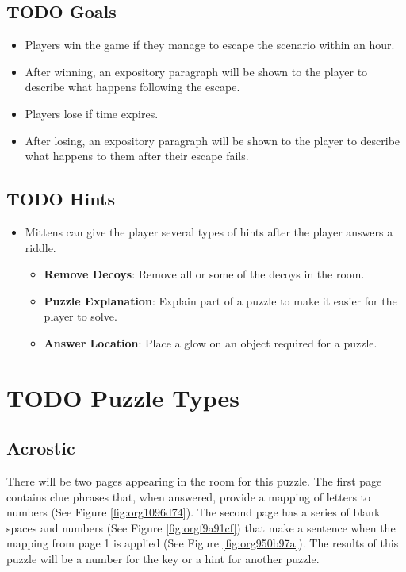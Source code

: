\documentclass[11pt]{article}
\begin{document}
\subsection{{\bfseries\sffamily TODO} Goals}
\label{sec:orgcfdaecd}
\begin{itemize}
\item Players win the game if they manage to escape the scenario within an hour.
\item After winning, an expository paragraph will be shown to the player to describe what happens following the escape.
\item Players lose if time expires.
\item After losing, an expository paragraph will be shown to the player to describe what happens to them after their escape fails.
\end{itemize}

\subsection{{\bfseries\sffamily TODO} Hints}
\label{sec:org83f34a4}
\begin{itemize}
\item Mittens can give the player several types of hints after the player answers a riddle.
\begin{itemize}
\item \textbf{Remove Decoys}: Remove all or some of the decoys in the room.
\item \textbf{Puzzle Explanation}: Explain part of a puzzle to make it easier for the player to solve.
\item \textbf{Answer Location}: Place a glow on an object required for a puzzle.
\end{itemize}
\end{itemize}

\section{{\bfseries\sffamily TODO} Puzzle Types}
\label{sec:org7b9de13}
\subsection{Acrostic}
\label{sec:orga2f0fc2}
There will be two pages appearing in the room for this puzzle. The first page contains clue phrases that, when answered, provide a mapping of letters to numbers (See Figure \ref{fig:org1096d74}). The second page has a series of blank spaces and numbers (See Figure \ref{fig:orgf9a91cf}) that make a sentence when the mapping from page 1 is applied (See Figure \ref{fig:org950b97a}). The results of this puzzle will be a number for the key or a hint for another puzzle.
\end{document}
